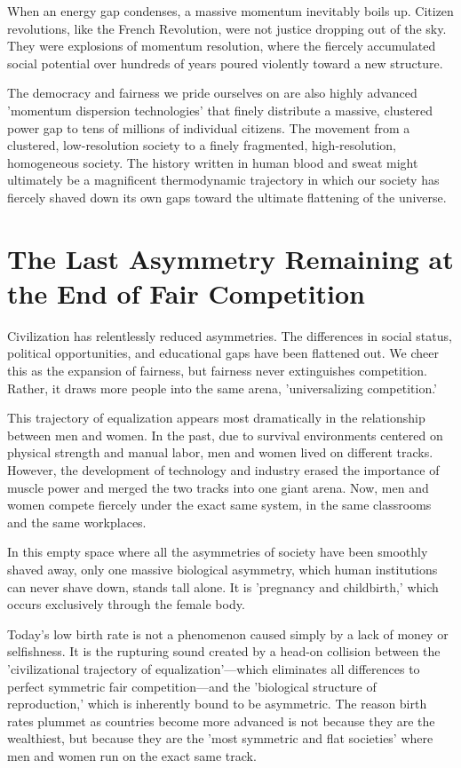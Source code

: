 \documentclass[11pt,a4paper]{article}
\begin{document}
When an energy gap condenses, a massive momentum inevitably boils up. Citizen revolutions, like the French Revolution, were not justice dropping out of the sky. They were explosions of momentum resolution, where the fiercely accumulated social potential over hundreds of years poured violently toward a new structure.

The democracy and fairness we pride ourselves on are also highly advanced 'momentum dispersion technologies' that finely distribute a massive, clustered power gap to tens of millions of individual citizens. The movement from a clustered, low-resolution society to a finely fragmented, high-resolution, homogeneous society. The history written in human blood and sweat might ultimately be a magnificent thermodynamic trajectory in which our society has fiercely shaved down its own gaps toward the ultimate flattening of the universe.

\section*{The Last Asymmetry Remaining at the End of Fair Competition}
Civilization has relentlessly reduced asymmetries. The differences in social status, political opportunities, and educational gaps have been flattened out. We cheer this as the expansion of fairness, but fairness never extinguishes competition. Rather, it draws more people into the same arena, 'universalizing competition.'

This trajectory of equalization appears most dramatically in the relationship between men and women. In the past, due to survival environments centered on physical strength and manual labor, men and women lived on different tracks. However, the development of technology and industry erased the importance of muscle power and merged the two tracks into one giant arena. Now, men and women compete fiercely under the exact same system, in the same classrooms and the same workplaces.

In this empty space where all the asymmetries of society have been smoothly shaved away, only one massive biological asymmetry, which human institutions can never shave down, stands tall alone. It is 'pregnancy and childbirth,' which occurs exclusively through the female body.

Today's low birth rate is not a phenomenon caused simply by a lack of money or selfishness. It is the rupturing sound created by a head-on collision between the 'civilizational trajectory of equalization'—which eliminates all differences to perfect symmetric fair competition—and the 'biological structure of reproduction,' which is inherently bound to be asymmetric. The reason birth rates plummet as countries become more advanced is not because they are the wealthiest, but because they are the 'most symmetric and flat societies' where men and women run on the exact same track.
\end{document}

